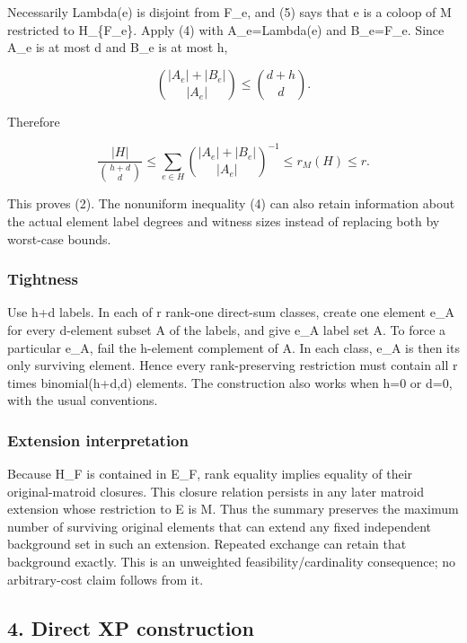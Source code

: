 Necessarily Lambda(e) is disjoint from F\_e, and (5) says that e is a coloop of M restricted to H\_\{F\_e\}. Apply (4) with A\_e=Lambda(e) and B\_e=F\_e. Since \textbar A\_e\textbar{} is at most d and \textbar B\_e\textbar{} is at most h,

\[
\binom{|A_e|+|B_e|}{|A_e|}\le\binom{d+h}{d}.
\]

Therefore

\[
\frac{|H|}{\binom{h+d}{d}}
\le\sum_{e\in H}\binom{|A_e|+|B_e|}{|A_e|}^{-1}
\le r_M(H)\le r.
\]

This proves (2). The nonuniform inequality (4) can also retain information about the actual element label degrees and witness sizes instead of replacing both by worst-case bounds.

\hypertarget{af-4c0863a692-tightness}{%
\subsubsection{Tightness}\label{af-4c0863a692-tightness}}

Use h+d labels. In each of r rank-one direct-sum classes, create one element e\_A for every d-element subset A of the labels, and give e\_A label set A. To force a particular e\_A, fail the h-element complement of A. In each class, e\_A is then its only surviving element. Hence every rank-preserving restriction must contain all r times binomial(h+d,d) elements. The construction also works when h=0 or d=0, with the usual conventions.

\hypertarget{af-4c0863a692-extension-interpretation}{%
\subsubsection{Extension interpretation}\label{af-4c0863a692-extension-interpretation}}

Because H\_F is contained in E\_F, rank equality implies equality of their original-matroid closures. This closure relation persists in any later matroid extension whose restriction to E is M. Thus the summary preserves the maximum number of surviving original elements that can extend any fixed independent background set in such an extension. Repeated exchange can retain that background exactly. This is an unweighted feasibility/cardinality consequence; no arbitrary-cost claim follows from it.

\hypertarget{af-4c0863a692-direct-xp-construction}{%
\subsection{4. Direct XP construction}\label{af-4c0863a692-direct-xp-construction}}

